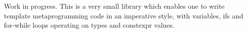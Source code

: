 \documentclass[10pt,a4paper,ragged2e,withhyper]{altacv}
\begin{document}
\begin{paracol}{2}
Work in progress. This is a very small library which enables one to write template metaprogramming code in an imperative style, with variables, ifs and for-while loops operating on types and constexpr values.













\switchcolumn


\end{paracol}
\end{document}
